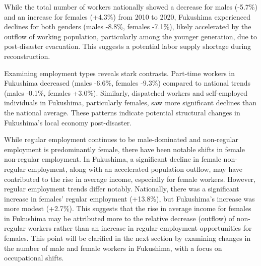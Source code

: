 \documentclass[a4paper,12pt]{article}
\begin{document}
While the total number of workers nationally showed a decrease for males (-5.7\%) and an increase for females (+4.3\%) from 2010 to 2020, Fukushima experienced declines for both genders (males -8.8\%, females -7.1\%), likely accelerated by the outflow of working population, particularly among the younger generation, due to post-disaster evacuation. This suggests a potential labor supply shortage during reconstruction.


Examining employment types reveals stark contrasts. Part-time workers in Fukushima decreased (males -6.6\%, females -9.3\%) compared to national trends (males -0.1\%, females +3.0\%). Similarly, dispatched workers and self-employed individuals in Fukushima, particularly females, saw more significant declines than the national average. These patterns indicate potential structural changes in Fukushima's local economy post-disaster.

While regular employment continues to be male-dominated and non-regular employment is predominantly female, there have been notable shifts in female non-regular employment. In Fukushima, a significant decline in female non-regular employment, along with an accelerated population outflow, may have contributed to the rise in average income, especially for female workers. However, regular employment trends differ notably. Nationally, there was a significant increase in females' regular employment (+13.8\%), but Fukushima's increase was more modest (+2.7\%). This suggests that the rise in average income for females in Fukushima may be attributed more to the relative decrease (outflow) of non-regular workers rather than an increase in regular employment opportunities for females. This point will be clarified in the next section by examining changes in the number of male and female workers in Fukushima, with a focus on occupational shifts.
\end{document}
